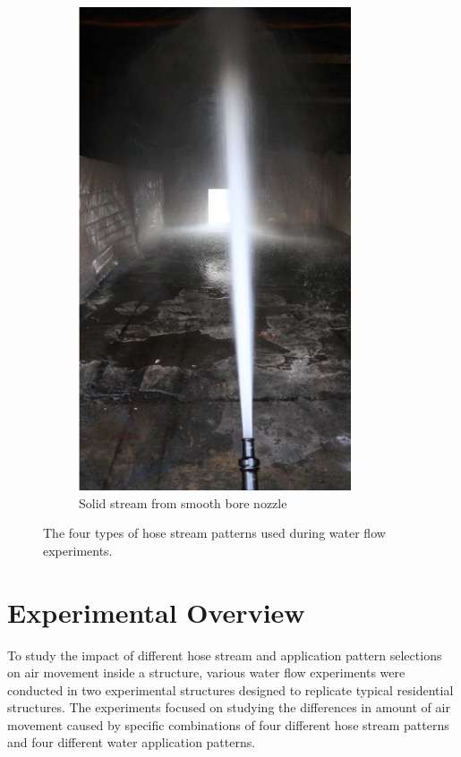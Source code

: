 \documentclass[12pt,oneside]{book}
\begin{document}
\begin{figure}[!ht]
\begin{subfigure}[b]{0.45\columnwidth}
		\includegraphics[width=0.75\columnwidth]{../Figures/Pictures/SB_70}
		\caption{Solid stream from smooth bore nozzle}
	\end{subfigure}
	\caption[Hose stream patterns used during experiments.]{The four types of hose stream patterns used during water flow experiments.}
	\label{fig:hose_streams}
\end{figure}

\clearpage

\chapter{Experimental Overview}
\label{chap:exp_overview}
To study the impact of different hose stream and application pattern selections on air movement inside a structure, various water flow experiments were conducted in two experimental structures designed to replicate typical residential structures. The experiments focused on studying the differences in amount of air movement caused by specific combinations of four different hose stream patterns and four different water application patterns.
\end{document}

